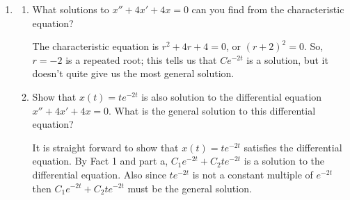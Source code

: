 \documentclass[main]{subfiles}
\begin{document}
\begin{enumerate}
\begin{solution}
  Since the characteristic equation has two distinct roots, the general
  solution of the differential equation is $x(t) = \boxed{C_1 e^{-5t} +
  C_2 e^{3t}}$.
  
 This differential equation could not model the motion of an oscillating spring, because the spring coefficient (i.e., the coefficient of $x$) in the equation is negative. This is not possible for an actual spring, because it would suggest that the force exerted by the tension in the spring is pushing the spring \textit{away} from its equilibrium position. See the solution to problem \#1(c).
  \end{solution}


  \item 

\begin{enumerate}
    \item \begin{problem}[2 in]
  What solutions to $x'' + 4x' + 4x = 0$ can you find from the characteristic equation?
  \end{problem}

  \begin{solution}
  The characteristic equation is $r^2 + 4r + 4 = 0$, or $(r + 2)^2 = 0$.
  So, $r = -2$ is a repeated root; this tells us that $Ce^{-2t}$ is a
  solution, but it doesn't quite give us the most general solution.
  \end{solution}

 \item 
 \begin{problem}[2in]
Show that $x(t) = t e^{-2t}$ is also solution to the differential equation $x'' + 4x' + 4x = 0$.
What is the general solution to this differential equation?
 \end{problem}
 
 \begin{solution}
  It is straight forward to show that $x(t) = t e^{-2t}$ satisfies the differential equation. By Fact 1 and part a, $C_1e^{-2t}+C_2te^{-2t}$ is a solution to the differential equation. Also since $te^{-2t}$ is not a constant multiple of $e^{-2t}$ then $C_1e^{-2t}+C_2te^{-2t}$ must be the general solution.
  \end{solution}
\end{enumerate}  
  

\end{enumerate}
\end{document}

